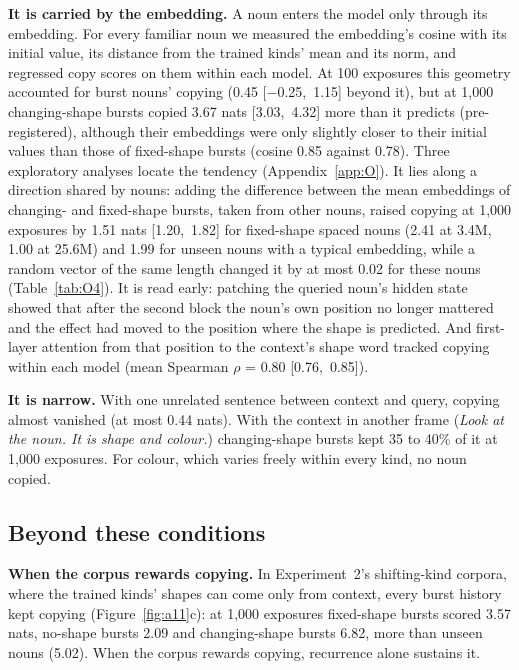 \documentclass[11pt]{article}
\begin{document}
\textbf{It is carried by the embedding.} A noun enters the model only through its embedding. For every familiar noun we measured the embedding's cosine with its initial value, its distance from the trained kinds' mean and its norm, and regressed copy scores on them within each model. At 100 exposures this geometry accounted for burst nouns' copying (0.45 [$-$0.25,~1.15] beyond it), but at 1,000 changing-shape bursts copied 3.67 nats [3.03,~4.32] more than it predicts (pre-registered), although their embeddings were only slightly closer to their initial values than those of fixed-shape bursts (cosine 0.85 against 0.78). Three exploratory analyses locate the tendency (Appendix~\ref{app:O}). It lies along a direction shared by nouns: adding the difference between the mean embeddings of changing- and fixed-shape bursts, taken from other nouns, raised copying at 1,000 exposures by 1.51 nats [1.20,~1.82] for fixed-shape spaced nouns (2.41 at 3.4M, 1.00 at 25.6M) and 1.99 for unseen nouns with a typical embedding, while a random vector of the same length changed it by at most 0.02 for these nouns (Table~\ref{tab:O4}). It is read early: patching the queried noun's hidden state \citep{zhang2024patching} showed that after the second block the noun's own position no longer mattered and the effect had moved to the position where the shape is predicted. And first-layer attention from that position to the context's shape word tracked copying within each model (mean Spearman $\rho$ = 0.80 [0.76,~0.85]).

\textbf{It is narrow.} With one unrelated sentence between context and query, copying almost vanished (at most 0.44 nats). With the context in another frame (\emph{Look at the \textit{noun}. It is \textit{shape} and \textit{colour}.}) changing-shape bursts kept 35 to 40\% of it at 1,000 exposures. For colour, which varies freely within every kind, no noun copied.

\subsection{Beyond these conditions}\label{sec:beyond}\label{sec:pythia}
\textbf{When the corpus rewards copying.} In Experiment~2's shifting-kind corpora, where the trained kinds' shapes can come only from context, every burst history kept copying (Figure~\ref{fig:a11}c): at 1,000 exposures fixed-shape bursts scored 3.57 nats, no-shape bursts 2.09 and changing-shape bursts 6.82, more than unseen nouns (5.02). When the corpus rewards copying, recurrence alone sustains it.
\end{document}
